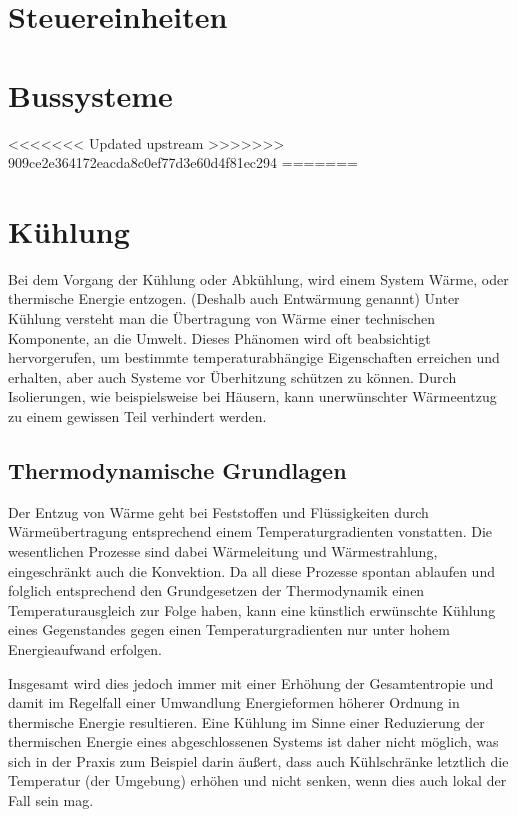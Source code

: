 \section{Steuereinheiten}
\section{Bussysteme}
<<<<<<< Updated upstream
>>>>>>> 909ce2e364172eacda8c0ef77d3e60d4f81ec294
=======

\newpage

\section{Kühlung} 

Bei dem Vorgang der Kühlung oder Abkühlung, wird einem System Wärme, oder thermische Energie entzogen. (Deshalb auch Entwärmung genannt)
Unter Kühlung versteht man die Übertragung von Wärme einer technischen Komponente, an die Umwelt. Dieses Phänomen wird oft beabsichtigt hervorgerufen, um bestimmte temperaturabhängige Eigenschaften erreichen und erhalten, aber auch Systeme vor Überhitzung schützen zu können. 
Durch Isolierungen, wie beispielsweise bei Häusern, kann unerwünschter Wärmeentzug zu einem gewissen Teil verhindert werden.



\subsection{Thermodynamische Grundlagen}

Der Entzug von Wärme geht bei Feststoffen und Flüssigkeiten durch Wärmeübertragung entsprechend einem Temperaturgradienten vonstatten. Die wesentlichen Prozesse sind dabei Wärmeleitung und Wärmestrahlung, eingeschränkt auch die Konvektion. Da all diese Prozesse spontan ablaufen und folglich entsprechend den Grundgesetzen der Thermodynamik einen Temperaturausgleich zur Folge haben, kann eine künstlich erwünschte Kühlung eines Gegenstandes gegen einen Temperaturgradienten nur unter hohem Energieaufwand erfolgen. 

Insgesamt wird dies jedoch immer mit einer Erhöhung der Gesamtentropie und damit im Regelfall einer Umwandlung Energieformen höherer Ordnung in thermische Energie resultieren. Eine Kühlung im Sinne einer Reduzierung der thermischen Energie eines abgeschlossenen Systems ist daher nicht möglich, was sich in der Praxis zum Beispiel darin äußert, dass auch Kühlschränke letztlich die Temperatur (der Umgebung) erhöhen und nicht senken, wenn dies auch lokal der Fall sein mag.

